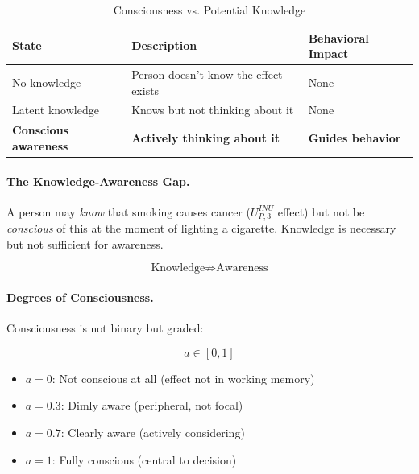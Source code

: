 \begin{table}[htbp]
\centering
\caption{Consciousness vs. Potential Knowledge}
\label{tab:consciousness-vs-potential}
\renewcommand{\arraystretch}{1.3}
\begin{tabular}{@{}lll@{}}
\toprule
\textbf{State} & \textbf{Description} & \textbf{Behavioral Impact} \\
\midrule
No knowledge & Person doesn't know the effect exists & None \\
Latent knowledge & Knows but not thinking about it & None \\
\textbf{Conscious awareness} & \textbf{Actively thinking about it} & \textbf{Guides behavior} \\
\bottomrule
\end{tabular}
\end{table}

\paragraph{The Knowledge-Awareness Gap.}
A person may \emph{know} that smoking causes cancer ($U^{INU}_{P,3}$ effect)
but not be \emph{conscious} of this at the moment of lighting a cigarette.
Knowledge is necessary but not sufficient for awareness.

\begin{equation}
\text{Knowledge} \not\Rightarrow \text{Awareness}
\end{equation}

\paragraph{Degrees of Consciousness.}
Consciousness is not binary but graded:

\begin{equation}
a \in [0, 1]
\end{equation}

\begin{itemize}
\item $a = 0$: Not conscious at all (effect not in working memory)
\item $a = 0.3$: Dimly aware (peripheral, not focal)
\item $a = 0.7$: Clearly aware (actively considering)
\item $a = 1$: Fully conscious (central to decision)
\end{itemize}

